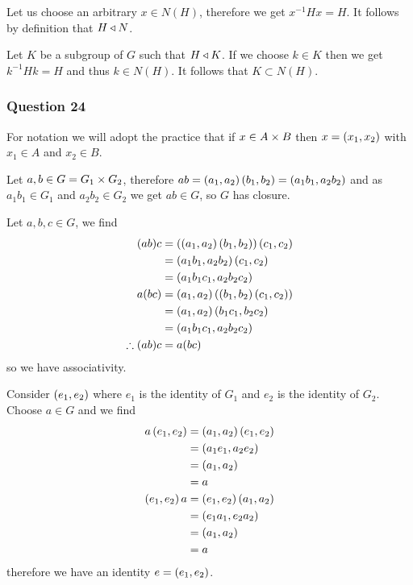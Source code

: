\documentclass{article}
\begin{document}
 Let us choose an arbitrary $x \in N(H)$, therefore we get $x^{-1}Hx = H$. It follows by definition that $H\triangleleft N$.

 Let $K$ be a subgroup of $G$ such that $H\triangleleft K$. If we choose $k \in K$ then we get $k^{-1}Hk = H$ and thus $k \in N(H)$. It follows that $K \subset N(H)$.

\subsubsection{Question 24}

For notation we will adopt the practice that if $x \in A\times B$ then $x = \left( {x_1} , {x_2} \right)$ with $x_1 \in A$ and $x_2 \in B$.

Let $a,b \in G = G_1\times G_2$, therefore $ab = \left( {a_1} , {a_2} \right)\left( {b_1} , {b_2} \right) = \left( {a_1b_1} , {a_2b_2} \right)$ and as $a_1b_1 \in G_1$ and $a_2b_2 \in G_2$ we get $ab \in G$, so $G$ has closure.

Let $a,b,c\in G$, we find
\begin{align*}
(ab)c &= \left(\left( {a_1} , {a_2} \right)\left( {b_1} , {b_2} \right)\right)\left( {c_1} , {c_2} \right) \\
&= \left( {a_1b_1} , {a_2b_2} \right)\left( {c_1} , {c_2} \right) \\
&= \left( {a_1b_1c_1} , {a_2b_2c_2} \right) \\
a(bc) &= \left( {a_1} , {a_2} \right)\left(\left( {b_1} , {b_2} \right)\left( {c_1} , {c_2} \right)\right) \\
&= \left( {a_1} , {a_2} \right)\left( {b_1c_1} , {b_2c_2} \right) \\
&= \left( {a_1b_1c_1} , {a_2b_2c_2} \right) \\
\therefore (ab)c &= a(bc)
\end{align*}
so we have associativity.

Consider $\left( {e_1} , {e_2} \right)$ where $e_1$ is the identity of $G_1$ and $e_2$ is the identity of $G_2$. Choose $a\in G$ and we find
\begin{align*}
a\left( {e_1} , {e_2} \right) &= \left( {a_1} , {a_2} \right)\left( {e_1} , {e_2} \right) \\
&= \left( {a_1e_1} , {a_2e_2} \right) \\
&= \left( {a_1} , {a_2} \right) \\
&= a \\
\left( {e_1} , {e_2} \right)a &= \left( {e_1} , {e_2} \right)\left( {a_1} , {a_2} \right) \\
&= \left( {e_1a_1} , {e_2a_2} \right) \\
&= \left( {a_1} , {a_2} \right) \\
&= a \\
\end{align*}
therefore we have an identity $e = \left( {e_1} , {e_2} \right)$.
\end{document}
